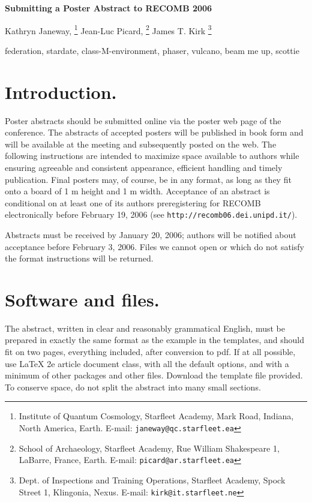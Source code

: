 \documentclass[twoside]{article}
\begin{document}
\thispagestyle{headings}
\begin{center}
\Large \bf Submitting  a Poster Abstract to RECOMB 2006\\

\vspace{.5cm}\normalsize

Kathryn Janeway,
\footnote{Institute of Quantum Cosmology, Starfleet Academy, Mark Road, Indiana,
North America, Earth. E-mail: {\tt janeway@qc.starfleet.ea}}
Jean-Luc Picard,
\footnote{School of Archaeology, Starfleet Academy, Rue William Shakespeare 1,
LaBarre, France, Earth. E-mail:  {\tt picard@ar.starfleet.ea}}
James T. Kirk
\footnote{Dept. of Inspections and Training Operations, Starfleet Academy,
Spock Street 1, Klingonia, Nexus. E-mail:
{\tt kirk@it.starfleet.ne}}
\end{center}

\small

\vspace{.3cm}

 federation, stardate, class-M-environment, phaser, vulcano,
 beam me up, scottie

\section{\large Introduction.} Poster abstracts should be submitted
online via the poster web page of the conference. The abstracts of
accepted posters will be published in book form and will be
available at the meeting and subsequently posted on the web. The
following instructions are intended to maximize space available to
authors while ensuring agreeable and consistent appearance,
efficient handling and timely publication. Final posters may, of
course, be in any format, as long as they fit onto a board of 1 m
height and 1 m width. Acceptance of an abstract is conditional on at
least one of its authors preregistering for RECOMB electronically
before February 19, 2006 (see {\tt http://recomb06.dei.unipd.it/}).

Abstracts must be received by January 20, 2006; authors will be
notified about acceptance before February 3, 2006. Files we cannot
open or which do not satisfy the format instructions will be
returned.

\section{\large Software and files.}The abstract, written in clear and
reasonably grammatical English, must be prepared in exactly the same format as
the example in the templates, and should fit on two pages, everything included,
after conversion to pdf.
If at all possible, use LaTeX 2e article document class, with all the default
options, and with a minimum of other packages and other files.  Download the
template file provided. To conserve space, do not split the abstract into many
small sections.
\end{document}
